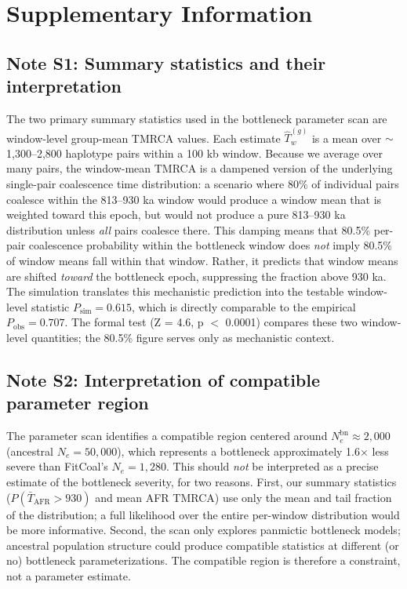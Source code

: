 
\section*{Supplementary Information}

\subsection*{Note S1: Summary statistics and their interpretation}

The two primary summary statistics used in the bottleneck parameter scan are window-level group-mean TMRCA values. Each estimate $\hat{T}_w^{(g)}$ is a mean over $\sim$1,300--2,800 haplotype pairs within a 100 kb window. Because we average over many pairs, the window-mean TMRCA is a dampened version of the underlying single-pair coalescence time distribution: a scenario where 80\% of individual pairs coalesce within the 813--930 ka window would produce a window mean that is weighted toward this epoch, but would not produce a pure 813--930 ka distribution unless \textit{all} pairs coalesce there. This damping means that 80.5\% per-pair coalescence probability within the bottleneck window does \textit{not} imply 80.5\% of window means fall within that window. Rather, it predicts that window means are shifted \textit{toward} the bottleneck epoch, suppressing the fraction above 930 ka. The simulation translates this mechanistic prediction into the testable window-level statistic $P_\text{sim} = 0.615$, which is directly comparable to the empirical $P_\text{obs} = 0.707$. The formal test (Z = 4.6, p $<$ 0.0001) compares these two window-level quantities; the 80.5\% figure serves only as mechanistic context.

\subsection*{Note S2: Interpretation of compatible parameter region}

The parameter scan identifies a compatible region centered around $N_e^{\text{bn}} \approx 2{,}000$ (ancestral $N_e = 50{,}000$), which represents a bottleneck approximately 1.6$\times$ less severe than FitCoal's $N_e = 1{,}280$. This should \textit{not} be interpreted as a precise estimate of the bottleneck severity, for two reasons. First, our summary statistics ($P(\bar{T}_\text{AFR} > 930)$ and mean AFR TMRCA) use only the mean and tail fraction of the distribution; a full likelihood over the entire per-window distribution would be more informative. Second, the scan only explores panmictic bottleneck models; ancestral population structure could produce compatible statistics at different (or no) bottleneck parameterizations. The compatible region is therefore a constraint, not a parameter estimate.

